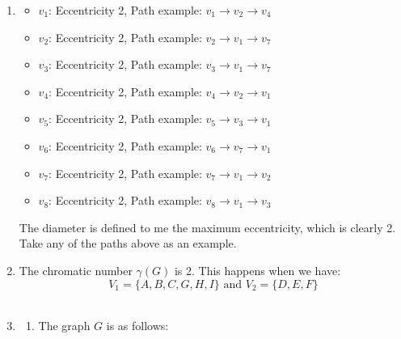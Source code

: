 \documentclass[a4paper]{article}
\begin{document}
\begin{enumerate}
        \item \begin{itemize}
            \item \(v_1\): Eccentricity 2, Path example: \(v_1 \rightarrow v_2 \rightarrow v_4\)
            \item \(v_2\): Eccentricity 2, Path example: \(v_2 \rightarrow v_1 \rightarrow v_7\)
            \item \(v_3\): Eccentricity 2, Path example: \(v_3 \rightarrow v_1 \rightarrow v_7\)
            \item \(v_4\): Eccentricity 2, Path example: \(v_4 \rightarrow v_2 \rightarrow v_1\)
            \item \(v_5\): Eccentricity 2, Path example: \(v_5 \rightarrow v_3 \rightarrow v_1\)
            \item \(v_6\): Eccentricity 2, Path example: \(v_6 \rightarrow v_7 \rightarrow v_1\)
            \item \(v_7\): Eccentricity 2, Path example: \(v_7 \rightarrow v_1 \rightarrow v_2\)
            \item \(v_8\): Eccentricity 2, Path example: \(v_8 \rightarrow v_1 \rightarrow v_3\)
        \end{itemize}

        The diameter is defined to me the maximum eccentricity, which is clearly 2. Take any of the paths above as an example. \\

        \item The chromatic number $\gamma (G)$ is 2. This happens when we have:\\
        \[ V_1 = \{ A, B, C, G, H, I \} \text{ and } V_2 = \{ D, E, F \} \] \\

        \item \begin{enumerate}
            \item The graph $G$ is as follows:\\
             \\


\end{enumerate}
\end{enumerate}
\end{document}
